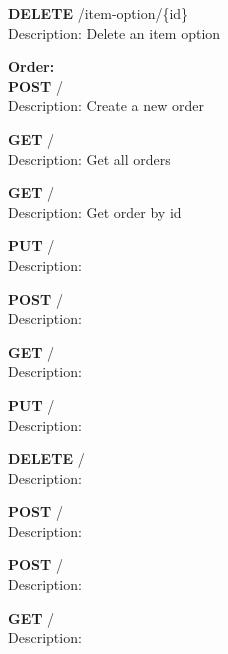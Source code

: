 \documentclass[11pt,a4paper,pdftex]{article}
\begin{document}
\hspace*{1em}\textbf{DELETE} /item-option/\{id\}\\
\hspace*{2em}Description: Delete an item option

\textbf{Order:}\\
\hspace*{1em}\textbf{POST} /\\
\hspace*{2em}Description: Create a new order

\hspace*{1em}\textbf{GET} /\\
\hspace*{2em}Description: Get all orders

\hspace*{1em}\textbf{GET} /\\
\hspace*{2em}Description: Get order by id

\hspace*{1em}\textbf{PUT} /\\
\hspace*{2em}Description: 

\hspace*{1em}\textbf{POST} /\\
\hspace*{2em}Description: 

\hspace*{1em}\textbf{GET} /\\
\hspace*{2em}Description: 

\hspace*{1em}\textbf{PUT} /\\
\hspace*{2em}Description: 

\hspace*{1em}\textbf{DELETE} /\\
\hspace*{2em}Description: 

\hspace*{1em}\textbf{POST} /\\
\hspace*{2em}Description: 

\hspace*{1em}\textbf{POST} /\\
\hspace*{2em}Description: 

\hspace*{1em}\textbf{GET} /\\
\hspace*{2em}Description: 
\end{document}
